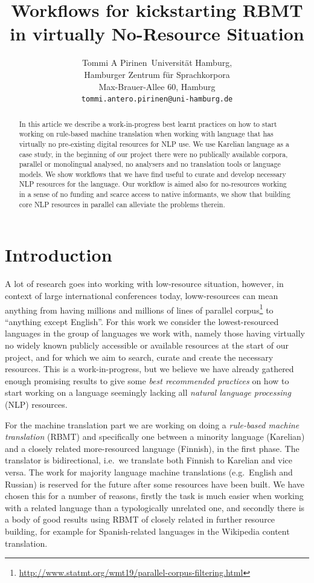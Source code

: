 \documentclass{flammie}
\title{Workflows for kickstarting RBMT in virtually No-Resource Situation}
\author{Tommi A Pirinen\
  Universität Hamburg,\\
  Hamburger Zentrum für Sprachkorpora\\
  Max-Brauer-Allee 60, Hamburg\\
  {\tt tommi.antero.pirinen@uni-hamburg.de}}
\date{}
\begin{document}
\maketitle
\begin{abstract}
    In this article we describe a work-in-progress best learnt practices on how
    to start working on rule-based machine translation when working with
    language that has virtually no pre-existing digital resources for NLP use.
    We use Karelian language as a case study, in the beginning of our project
    there were no publically available corpora, parallel or monolingual
    analysed, no analysers and no translation tools or language models. We show
    workflows that we have find useful to curate and develop necessary NLP
    resources for the language. Our workflow is aimed also for no-resources
    working in a sense of no funding and scarce access to native informants, we
    show that building core NLP resources in parallel can alleviate the problems
    therein.
\end{abstract}

\section{Introduction}

A lot of research goes into working with low-resource situation, however, in
context of large international conferences today, loww-resources can mean
anything from having millions and millions of lines of parallel
corpus\footnote{\url{http://www.statmt.org/wmt19/parallel-corpus-filtering.html}}
to ``anything except English''. For this work we consider the lowest-resourced
languages in the group of languages we work with, namely those having virtually
no widely known publicly accessible or available resources at the start of our
project, and for which we aim to search, curate and create the necessary
resources. This is a work-in-progress, but we believe we have already gathered
enough promising results to give some \textit{best recommended practices} on
how to start working on a language seemingly lacking all \textit{natural
language processing} (NLP) resources.

For the machine translation part we are working on doing a \textit{rule-based
machine translation} (RBMT) and specifically one between a minority language
(Karelian) and a closely related more-resourced language (Finnish), in the first
phase. The translator is bidirectional, i.e.\ we translate both Finnish to
Karelian and vice versa.  The work for majority language machine translations
(e.g.\ English and Russian) is reserved for the future after some resources have
been built.  We have chosen this for a number of reasons, firstly the task is
much easier when working with a related language than a typologically unrelated
one, and secondly there is a body of good results using RBMT of closely related
in further resource building, for example for Spanish-related languages in the
Wikipedia content translation.
\end{document}
